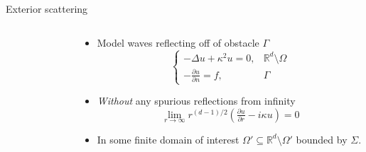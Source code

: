 \documentclass{beamer}
\begin{document}
\begin{frame}{Exterior scattering}
    \begin{columns}
    \begin{column}{0.45\textwidth}
        \begin{figure}[ht]
        \begin{center}
        \end{center}\label{fig:2ddomain}
        \end{figure}
    \end{column}
    \begin{column}{0.55\textwidth}
        \begin{itemize}
            \item<1-> Model waves reflecting off of obstacle $\Gamma$
            \[
                \begin{cases}
                    -\Delta u + \kappa^2 u = 0, &  \mathbb R^d\setminus\Omega \\
                    -\frac{\partial u}{\partial n} = f, & \Gamma
                \end{cases}
            \]
            \item<2-> \emph{Without} any spurious reflections from infinity
            \[
                \lim_{r\to\infty} r^{(d-1)/2}
                    \left(\tfrac{\partial u}{\partial r} - i\kappa u\right)
                = 0
            \]
            \item<3-> In some finite domain of interest 
            $\Omega'\subseteq \mathbb R^d\setminus\Omega'$
            bounded by $\Sigma$.
        \end{itemize}
    \end{column}
\end{columns}
\end{frame}
\end{document}
